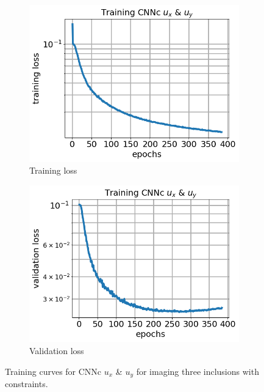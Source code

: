 \documentclass[12pt]{article}
\newcommand{\nhgfigheight}{4.0cm}
\begin{document}
%
\begin{figure}[h]
  \centering
  \begin{subfigure}[b]{0.45\linewidth}
    \includegraphics[totalheight=\nhgfigheight]{Figures/final3c/training/uxuy/field_images_plot_loss.png}
    \caption{Training loss}
  \end{subfigure}
  \begin{subfigure}[b]{0.45\linewidth}
    \includegraphics[totalheight=\nhgfigheight]{Figures/final3c/training/uxuy/field_images_plot_val_loss.png}
    \caption{Validation loss}
  \end{subfigure}
  \caption{\label{fig:threeinctanh:trainuxuy} Training curves for CNNc $u_x$ \& $u_y$ for imaging three inclusions with constraints.}
\end{figure}
\end{document}
